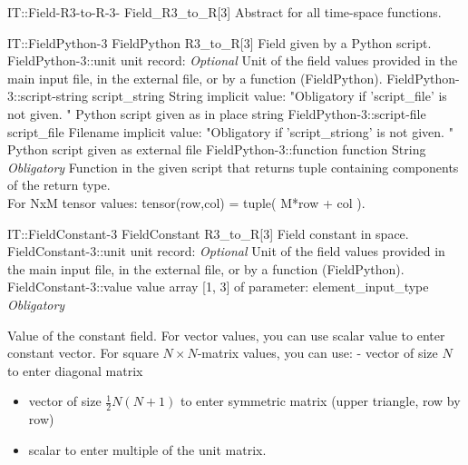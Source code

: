 \begin{AbstractType}
	{IT::Field-R3-to-R-3-}
	{Field{\_}R3{\_}to{\_}R[3]}
	{}
	{{{Abstract for all time-space functions.}%
}}
\end{AbstractType}
\begin{RecordType}
	{IT::FieldPython-3}
	{FieldPython}
	{}%
	{}%
	{{{R3{\_}to{\_}R[3] Field given by a Python script.}%
}}
		\RecKey
			{FieldPython-3::unit}
			{unit}
			{{record: }}{}
			{ \it{Optional}}
			{{{Unit of the field values provided in the main input file, in the external file, or by a function (FieldPython).}%
}}
		\RecKey
			{FieldPython-3::script-string}
			{script{\_}string}
			{{String}}{}
			{implicit value: "{Obligatory if 'script{\_}file' is not given. }"}
			{{{Python script given as in place string}%
}}
		\RecKey
			{FieldPython-3::script-file}
			{script{\_}file}
			{{Filename}}{}
			{implicit value: "{Obligatory if 'script{\_}striong' is not given. }"}
			{{{Python script given as external file}%
}}
		\RecKey
			{FieldPython-3::function}
			{function}
			{{String}}{}
			{ \it{Obligatory}}
			{{{Function in the given script that returns tuple containing components of the return type.}\\{
For NxM tensor values: tensor(row,col) = tuple( M*row + col ).}%
}}
\end{RecordType}
\begin{RecordType}
	{IT::FieldConstant-3}
	{FieldConstant}
	{}%
	{}%
	{{{R3{\_}to{\_}R[3] Field constant in space.}%
}}
		\RecKey
			{FieldConstant-3::unit}
			{unit}
			{{record: }}{}
			{ \it{Optional}}
			{{{Unit of the field values provided in the main input file, in the external file, or by a function (FieldPython).}%
}}
		\RecKey
			{FieldConstant-3::value}
			{value}
			{{array [1, 3] of }{parameter: element{\_}input{\_}type}}{}
			{ \it{Obligatory}}
			{{{{Value of the constant field.
For vector values, you can use scalar value to enter constant vector.
For square }{$N\times N$}{-matrix values, you can use:  - vector of size }{$N$}{ to enter diagonal matrix}
% 
}
\begin{itemize}
\item {vector of size }{$\frac12N(N+1)$}{ to enter symmetric matrix (upper triangle, row by row)}
\item {scalar to enter multiple of the unit matrix.}
\end{itemize}
}}
\end{RecordType}
